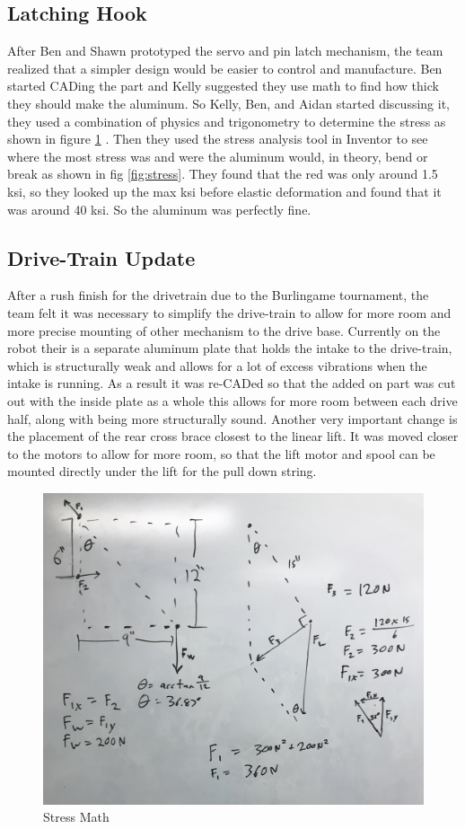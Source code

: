 \documentclass{article}
\begin{document}
\subsection{Latching Hook}
After Ben and Shawn prototyped the servo and pin latch mechanism, the team realized that a simpler design would be easier to control and manufacture. Ben started CADing the part and Kelly suggested they use math to find how thick they should make the aluminum. So Kelly, Ben, and Aidan started discussing it, they used a combination of physics and trigonometry to determine the stress as shown in figure \ref{fig:math} . Then they used the stress analysis tool in Inventor to see where the most stress was and were the aluminum would, in theory, bend or break as shown in fig \ref{fig:stress}. They found that the red was only around 1.5 ksi, so they looked up the max ksi before elastic deformation and found that it was around 40 ksi. So the aluminum was perfectly fine.

\subsection{Drive-Train Update}
After a rush finish for the drivetrain due to the Burlingame tournament, the team felt it was necessary to simplify the drive-train to allow for more room and more precise mounting of other mechanism to the drive base. Currently on the robot their is a separate aluminum plate that holds the intake to the drive-train, which is structurally  weak and allows for a lot of excess vibrations when the intake is running. As a result it was re-CADed so that the added on part was cut out with the inside plate as a whole this allows for more room between each drive half, along with being more structurally sound. Another very important change is the placement of the rear cross brace closest to the linear lift. It was moved closer to the motors to allow for more room, so that the lift motor and spool can be mounted directly under the lift for the pull down string. 

\begin{figure}
    \centering
    \includegraphics[width=.6 \textwidth]{14_12-03/images/Math.jpg}
    \caption{Stress Math}
    \label{fig:math}
\end{figure}
\end{document}
